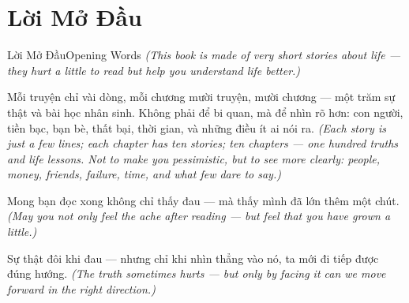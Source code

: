 \chapter*{Lời Mở Đầu}

\begin{truyen}{Lời Mở Đầu}{Opening Words}
\textit{(This book is made of very short stories about life — they hurt a little to read but help you understand life better.)}

Mỗi truyện chỉ vài dòng, mỗi chương mười truyện, mười chương — một trăm sự thật và bài học nhân sinh. Không phải để bi quan, mà để nhìn rõ hơn: con người, tiền bạc, bạn bè, thất bại, thời gian, và những điều ít ai nói ra.
\textit{(Each story is just a few lines; each chapter has ten stories; ten chapters — one hundred truths and life lessons. Not to make you pessimistic, but to see more clearly: people, money, friends, failure, time, and what few dare to say.)}

Mong bạn đọc xong không chỉ thấy đau — mà thấy mình đã lớn thêm một chút.
\textit{(May you not only feel the ache after reading — but feel that you have grown a little.)}
\end{truyen}

\begin{baihoc}
Sự thật đôi khi đau — nhưng chỉ khi nhìn thẳng vào nó, ta mới đi tiếp được đúng hướng.
\textit{(The truth sometimes hurts — but only by facing it can we move forward in the right direction.)}
\end{baihoc}
\ngancach
